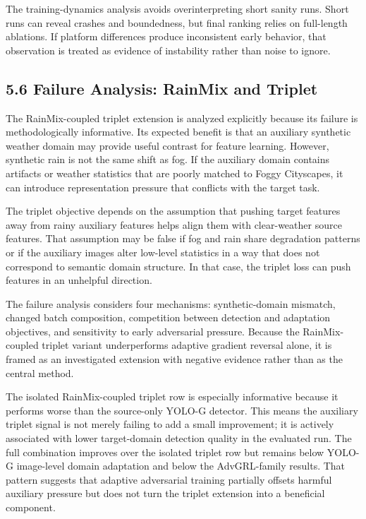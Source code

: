 \documentclass[
  11pt,
]{article}
\begin{document}
The training-dynamics analysis avoids overinterpreting short sanity
runs. Short runs can reveal crashes and boundedness, but final ranking
relies on full-length ablations. If platform differences produce
inconsistent early behavior, that observation is treated as evidence of
instability rather than noise to ignore.

\hypertarget{failure-analysis-rainmix-and-triplet}{%
\subsection{5.6 Failure Analysis: RainMix and
Triplet}\label{failure-analysis-rainmix-and-triplet}}

The RainMix-coupled triplet extension is analyzed explicitly because its
failure is methodologically informative. Its expected benefit is that an
auxiliary synthetic weather domain may provide useful contrast for
feature learning. However, synthetic rain is not the same shift as fog.
If the auxiliary domain contains artifacts or weather statistics that
are poorly matched to Foggy Cityscapes, it can introduce representation
pressure that conflicts with the target task.

The triplet objective depends on the assumption that pushing target
features away from rainy auxiliary features helps align them with
clear-weather source features. That assumption may be false if fog and
rain share degradation patterns or if the auxiliary images alter
low-level statistics in a way that does not correspond to semantic
domain structure. In that case, the triplet loss can push features in an
unhelpful direction.

The failure analysis considers four mechanisms: synthetic-domain
mismatch, changed batch composition, competition between detection and
adaptation objectives, and sensitivity to early adversarial pressure.
Because the RainMix-coupled triplet variant underperforms adaptive
gradient reversal alone, it is framed as an investigated extension with
negative evidence rather than as the central method.

The isolated RainMix-coupled triplet row is especially informative
because it performs worse than the source-only YOLO-G detector. This
means the auxiliary triplet signal is not merely failing to add a small
improvement; it is actively associated with lower target-domain
detection quality in the evaluated run. The full combination improves
over the isolated triplet row but remains below YOLO-G image-level
domain adaptation and below the AdvGRL-family results. That pattern
suggests that adaptive adversarial training partially offsets harmful
auxiliary pressure but does not turn the triplet extension into a
beneficial component.
\end{document}
